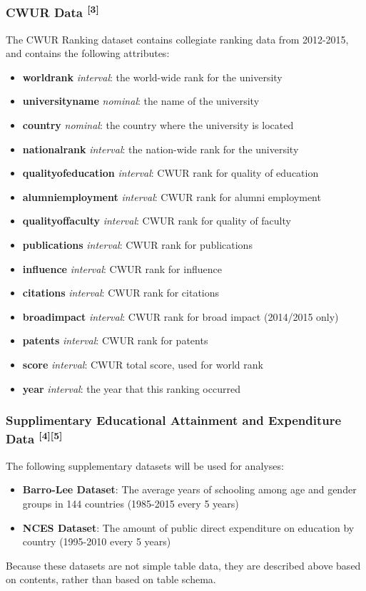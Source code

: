 \documentclass[12pt]{article}
\begin{document}
\subsubsection{CWUR Data \textsuperscript{[3]}}
The CWUR Ranking dataset contains collegiate ranking data from 2012-2015, and contains the following attributes:
\begin{itemize}
\item \textbf{world\textunderscore rank} \textit{interval}: the world-wide rank for the university
\item \textbf{university\textunderscore name} \textit{nominal}: the name of the university
\item \textbf{country} \textit{nominal}: the country where the university is located
\item \textbf{national\textunderscore rank} \textit{interval}: the nation-wide rank for the university
\item \textbf{quality\textunderscore of\textunderscore education} \textit{interval}: CWUR rank for quality of education
\item \textbf{alumni\textunderscore employment} \textit{interval}: CWUR rank for alumni employment
\item \textbf{quality\textunderscore of\textunderscore faculty} \textit{interval}: CWUR rank for quality of faculty
\item \textbf{publications} \textit{interval}: CWUR rank for publications
\item \textbf{influence} \textit{interval}: CWUR rank for influence
\item \textbf{citations} \textit{interval}: CWUR rank for citations
\item \textbf{broad\textunderscore impact} \textit{interval}: CWUR rank for broad impact (2014/2015 only)
\item \textbf{patents} \textit{interval}: CWUR rank for patents
\item \textbf{score} \textit{interval}: CWUR total score, used for world rank
\item \textbf{year} \textit{interval}: the year that this ranking occurred
\end{itemize}

\subsubsection{Supplimentary Educational Attainment and Expenditure Data \textsuperscript{[4][5]}}

The following supplementary datasets will be used for analyses:
\begin{itemize}
\item \textbf{Barro-Lee Dataset}: The average years of schooling among age and gender groups in 144 countries (1985-2015 every 5 years)
\item \textbf{NCES Dataset}: The amount of public direct expenditure on education by country (1995-2010 every 5 years)
\end{itemize}
Because these datasets are not simple table data, they are described above based on contents, rather than based on table schema.
\end{document}
